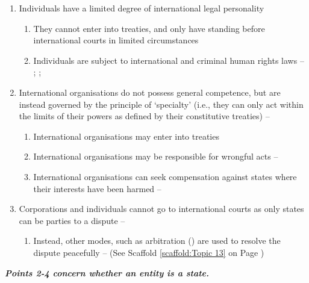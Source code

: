\begin{enumerate}
\begin{enumerate}
\begin{enumerate}
        \end{enumerate}
        \item Individuals have a limited degree of international legal personality
        \begin{enumerate}
            \item They cannot enter into treaties, and only have standing before international courts in limited circumstances
            \item Individuals are subject to international and criminal human rights laws -- ; ; 
        \end{enumerate}
        \item International organisations do not possess general competence, but are instead governed by the principle of `specialty' (i.e., they can only act within the limits of their powers as defined by their constitutive treaties) -- 
        \begin{enumerate}
            \item International organisations may enter into treaties
            \item International organisations may be responsible for wrongful acts -- 
            \item International organisations can seek compensation against states where their interests have been harmed -- 
        \end{enumerate}
        \item Corporations and individuals cannot go to international courts as only states can be parties to a dispute -- 
        \begin{enumerate}
            \item Instead, other modes, such as arbitration () are used to resolve the dispute peacefully --  (See Scaffold \ref{scaffold:Topic 13} on Page \pageref{scaffold:Topic 13})
        \end{enumerate}
    \end{enumerate}
    \textit{\textbf{Points 2-4 concern whether an entity is a state.}}

\end{enumerate}
